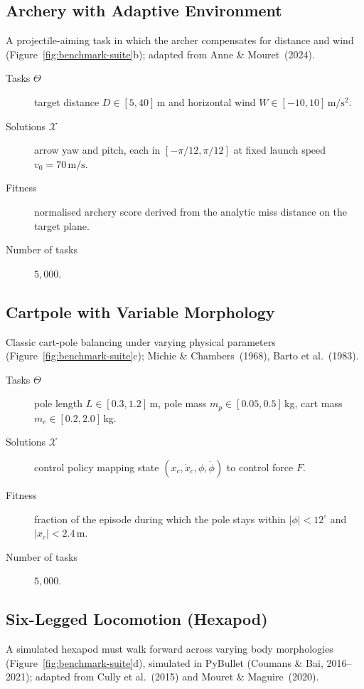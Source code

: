 \documentclass[11pt,a4paper]{article}
\begin{document}
\subsection{Archery with Adaptive Environment}
A projectile-aiming task in which the archer compensates for distance
and wind (Figure~\ref{fig:benchmark-suite}b); adapted from Anne \&
Mouret~(2024).

\begin{description}
    \item[Tasks $\Theta$] target distance $D\in[5,40]$\,m and horizontal
    wind $W\in[-10,10]\,\mathrm{m/s^2}$.
    \item[Solutions $\mathcal{X}$] arrow yaw and pitch, each in
    $[-\pi/12,\pi/12]$ at fixed launch speed $v_{0}=70\,\mathrm{m/s}$.
    \item[Fitness] normalised archery score derived from the analytic
    miss distance on the target plane.
    \item[Number of tasks] $5{,}000$.
\end{description}

\subsection{Cartpole with Variable Morphology}
Classic cart-pole balancing under varying physical parameters
(Figure~\ref{fig:benchmark-suite}c); Michie \& Chambers~(1968), Barto
et al.~(1983).

\begin{description}
    \item[Tasks $\Theta$] pole length $L\in[0.3,1.2]$\,m, pole mass
    $m_{p}\in[0.05,0.5]$\,kg, cart mass $m_{c}\in[0.2,2.0]$\,kg.
    \item[Solutions $\mathcal{X}$] control policy mapping state
    $(x_{c},\dot{x}_{c},\phi,\dot{\phi})$ to control force $F$.
    \item[Fitness] fraction of the episode during which the pole stays
    within $|\phi|<12^{\circ}$ and $|x_{c}|<2.4$\,m.
    \item[Number of tasks] $5{,}000$.
\end{description}

\subsection{Six-Legged Locomotion (Hexapod)}
A simulated hexapod must walk forward across varying body morphologies
(Figure~\ref{fig:benchmark-suite}d), simulated in PyBullet (Coumans \&
Bai, 2016--2021); adapted from Cully et al.~(2015) and Mouret \&
Maguire~(2020).
\end{document}
